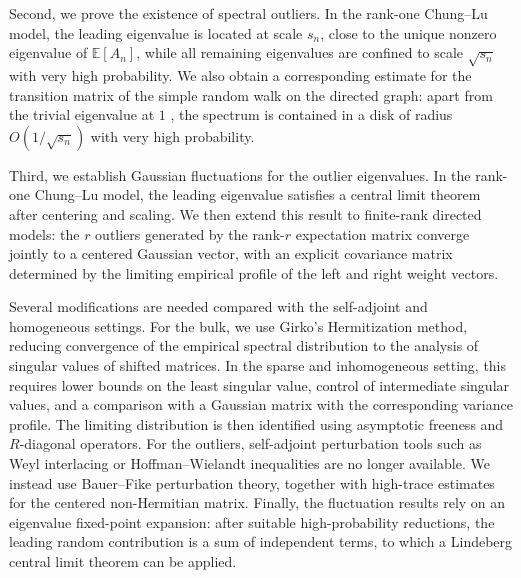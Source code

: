 \documentclass[11pt,oneside]{amsart}
\theoremstyle{plain}
\numberwithin{equation}{section}
\newcommand{\scaling}{s_n}
\begin{document}
Second, we prove the existence of spectral outliers. In the rank-one Chung--Lu model, the leading eigenvalue is located at scale $s_n$, close to the unique nonzero eigenvalue of $\mathbb{E}\left[A_n\right]$, while all remaining eigenvalues are confined to scale $\sqrt{s_n}$ with very high probability. We also obtain a corresponding estimate for the transition matrix of the simple random walk on the directed graph: apart from the trivial eigenvalue at $1$ , the spectrum is contained in a disk of radius $O(1/\sqrt{\scaling})$ with very high probability.

Third, we establish Gaussian fluctuations for the outlier eigenvalues. In the rank-one Chung--Lu model, the leading eigenvalue satisfies a central limit theorem after centering and scaling. We then extend this result to finite-rank directed models: the $r$ outliers generated by the rank-$r$ expectation matrix converge jointly to a centered Gaussian vector, with an explicit covariance matrix determined by the limiting empirical profile of the left and right weight vectors.

Several modifications are needed compared with the self-adjoint and homogeneous settings. For the bulk, we use Girko's Hermitization method, reducing convergence of the empirical spectral distribution to the analysis of singular values of shifted matrices. In the sparse and inhomogeneous setting, this requires lower bounds on the least singular value, control of intermediate singular values, and a comparison with a Gaussian matrix with the corresponding variance profile. The limiting distribution is then identified using asymptotic freeness and $R$-diagonal operators. For the outliers, self-adjoint perturbation tools such as Weyl interlacing or Hoffman--Wielandt inequalities are no longer available. We instead use Bauer--Fike perturbation theory, together with high-trace estimates for the centered non-Hermitian matrix. Finally, the fluctuation results rely on an eigenvalue fixed-point expansion: after suitable high-probability reductions, the leading random contribution is a sum of independent terms, to which a Lindeberg central limit theorem can be applied.
\end{document}
